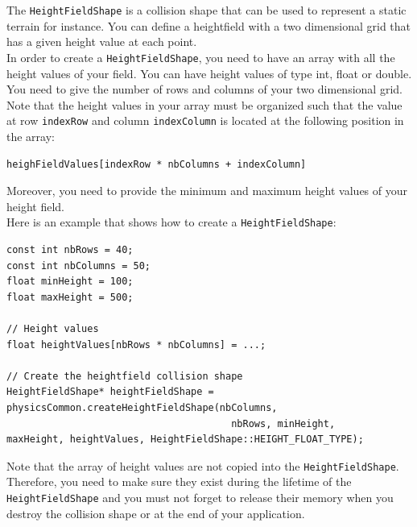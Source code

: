 \documentclass[a4paper,12pt]{article}
\begin{document}
  The \texttt{HeightFieldShape} is a collision shape that can be used to represent a static terrain for instance. You can
  define a heightfield with a two dimensional grid that has a given height value at each point. \\

  In order to create a \texttt{HeightFieldShape}, you need to have an array with all the height values of your field.
  You can have height values of type int, float or double. You need to give the number of rows and columns of your two
  dimensional grid. Note that the height values in your array must be organized such that the value at row
  \texttt{indexRow} and column \texttt{indexColumn} is located at the following position in the array: \\

  \begin{lstlisting}
heighFieldValues[indexRow * nbColumns + indexColumn]
  \end{lstlisting}

  \vspace{0.6cm}

  Moreover, you need to provide the minimum and maximum height values of your height field. \\

  Here is an example that shows how to create a \texttt{HeightFieldShape}: \\

  \begin{lstlisting}
const int nbRows = 40;
const int nbColumns = 50;
float minHeight = 100;
float maxHeight = 500;

// Height values
float heightValues[nbRows * nbColumns] = ...;

// Create the heightfield collision shape
HeightFieldShape* heightFieldShape = physicsCommon.createHeightFieldShape(nbColumns,
  							           nbRows, minHeight,
maxHeight, heightValues, HeightFieldShape::HEIGHT_FLOAT_TYPE);
  \end{lstlisting}

  \vspace{0.6cm}

  Note that the array of height values are not copied into the \texttt{HeightFieldShape}. Therefore, you need to make sure
  they exist during the lifetime of the \texttt{HeightField\allowbreak Shape} and you must not forget to release their memory when you
  destroy the collision shape or at the end of your application. \\
\end{document}
